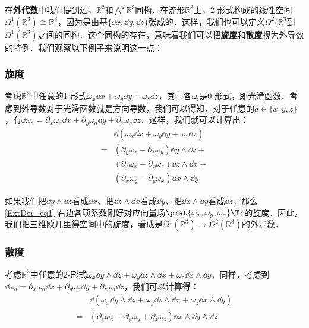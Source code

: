 在\textbf{外代数}中我们提到过，$\mathbb{R}^3$和$\bigwedge^2\mathbb{R}^3$同构．在流形$\mathbb{R}^3$上，2-形式构成的线性空间$\Omega^1(\mathbb{R}^3)\cong\mathbb{R}^3$，因为是由基$\{\dd x, \dd y, \dd z\}$张成的．这样，我们也可以定义$\Omega^2(\mathbb{R}^3$到$\Omega^1(\mathbb{R}^3)$之间的同构．这个同构的存在，意味着我们可以把\textbf{旋度}和\textbf{散度}视为外导数的特例．我们观察以下例子来说明这一点：

\subsubsection{旋度}

考虑$\mathbb{R}^3$中任意的1-形式$\omega_x\dd x+\omega_y\dd y+\omega_z\dd z$，其中各$\omega_i$是0-形式，即光滑函数．考虑到外导数对于光滑函数就是方向导数，我们可以得知，对于任意的$a\in\{x,y,z\}$，有$\dd\omega_a=\partial_x\omega_a\dd x+\partial_y\omega_a\dd y+\partial_z\omega_a\dd z$．这样，我们就可以计算出：
\begin{equation}\label{ExtDer_eq1}
\begin{aligned}
&\dd(\omega_x\dd x+\omega_y\dd y+\omega_z\dd z)\\=&(\partial_y\omega_z-\partial_z\omega_y)\dd y\wedge\dd z+\\&(\partial_z\omega_x-\partial_x\omega_z)\dd z\wedge\dd x+\\&(\partial_x\omega_y-\partial_y\omega_x)\dd x\wedge\dd y
\end{aligned}
\end{equation}

如果我们把$\dd y\wedge\dd z$看成$\dd x$、把$\dd z\wedge\dd x$看成$\dd y$、把$\dd x\wedge\dd y$看成$\dd z$，那么\autoref{ExtDer_eq1} 右边各项系数刚好对应向量场$\pmat{\omega_x, \omega_y, \omega_z}\Tr$的旋度．因此，我们把三维欧几里得空间中的旋度，看成是$\Omega^1(\mathbb{R}^3)\rightarrow\Omega^2(\mathbb{R}^3)$的外导数．

\subsubsection{散度}

考虑$\mathbb{R}^3$中任意的2-形式$\omega_x\dd y\wedge\dd z+\omega_y\dd z\wedge\dd x+\omega_z\dd x\wedge\dd y$．同样，考虑到$\dd\omega_a=\partial_x\omega_a\dd x+\partial_y\omega_a\dd y+\partial_z\omega_a\dd z$，我们可以计算得：
\begin{equation}\label{ExtDer_eq2}
\begin{aligned}
&\dd(\omega_x\dd y\wedge\dd z+\omega_y\dd z\wedge\dd x+\omega_z\dd x\wedge\dd y)\\=&(\partial_x\omega_x+\partial_y\omega_y+\partial_z\omega_z)\dd x\wedge\dd y\wedge\dd z
\end{aligned}
\end{equation}


